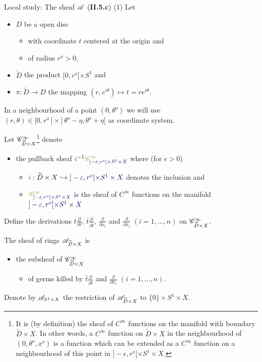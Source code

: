 \begin{frame}[t]{Local study: The sheaf $\mathscr{A}$ (\textbf{II.5.c}) (1)}
  Let
  \begin{itemize}
    \item $D$ be a open disc
      \begin{itemize}
        \item with coordinate $t$ centered at the origin and
        \item of radius $r^o>0$,
      \end{itemize}
    \item $\tilde D$ the product $[0,r^o[\times S^1$ and
    \item $\pi: \tilde D\to D$ the mapping
      $(r,e^{i\theta})\mapsto t=re^{i\theta}$.
  \end{itemize}
  In a neighbourhood of a point $(0,\theta^o)$ we will use
  $(r,\theta)\in[0,r^o[\times]\theta^o-\eta,\theta^o+\eta[$ as coordinate
  system.

  \def\myincl{\textcolor{green!40!black}{i}}
  \def\mymnf{\textcolor{blue!40!black}{]-\epsilon,r^o[\times S^1\times X}}
  \def\mysheaf{\textcolor{yellow!60!black}{\sC_{\mymnf}^\infty}}
  \def\mypbsheaf{\myincl^{-1}\mysheaf}
  Let $\mathscr{C}_{\widetilde D\times X}^\infty$\footnote{%
    It is (by definition) the sheaf of $C^\infty$ functions on the manifold
    with boundary $\tilde D\times X$. In other words, a $C^\infty$ function on
    $\tilde D\times X$ in the neighbourhood of $(0,\theta^o,x^o)$ is a function
    which can be extended as a $C^\infty$ function on a neighbourhood of this
    point in $]-\epsilon,r^o[\times S^1\times X$.}
  denote
  \begin{itemize}
    \item the pullback sheaf $\mypbsheaf$ where (for $\epsilon>0$)
      \begin{itemize}
        \item $\myincl:\tilde D\times X\hookrightarrow\mymnf$ denotes the
          inclusion and
          \item $\mysheaf$ is the sheaf of $C^\infty$ functions on the
            manifold $\mymnf$
      \end{itemize}
  \end{itemize}
  Define the derivations
  $t\frac{\partial}{\partial t}$, $\bar t\frac{\partial}{\partial\bar t}$,
  $\frac{\partial}{\partial x_i}$ and $\frac{\partial}{\partial\bar x_i}$
  $(i=1,\dots,n)$ on $\mathscr{C}_{\widetilde D\times X}^\infty$.
  \begin{defn}[II.5.10]
    The sheaf of rings $\mathscr{A}_{\widetilde D\times X}$ is
    \begin{itemize}
      \item the subsheaf of $\mathscr{C}_{\widetilde D\times X}^\infty$
        \begin{itemize}
          \item of germs killed by $\bar t\frac{\partial}{\partial\bar t}$ and
            $\frac{\partial}{\partial\bar x_i}$ $(i=1,\dots,n)$.
        \end{itemize}
    \end{itemize}
  \end{defn}
  Denote by $\mathscr{A}_{S^1\times X}$ the restriction of $\mathscr{A}_{\widetilde D\times X}$ to
  $\{0\}\times S^1\times X$.
\end{frame}

